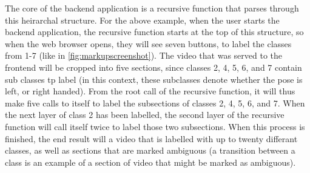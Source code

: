 
    The core of the backend application is a recursive function that parses through this heirarchal structure. For the above example, when the user starts the backend application, the recursive function starts at the top of this structure, so when the web browser opens, they will see seven buttons, to label the classes from 1-7 (like in \ref{fig:markupscreenshot}). The video that was served to the frontend will be cropped into five sections, since classes 2, 4, 5, 6, and 7 contain sub classes tp label (in this context, these subclasses denote whether the pose is left, or right handed). From the root call of the recursive function, it will thus make five calls to itself to label the subsections of classes 2, 4, 5, 6, and 7. When the next layer of class 2 has been labelled, the second layer of the recursive function will call itself twice to label those two subsections. When this process is finished, the end result will a video that is labelled with up to twenty differant classes, as well as sections that are marked ambiguous (a transition between a class is an example of a section of video that might be marked as ambiguous).

